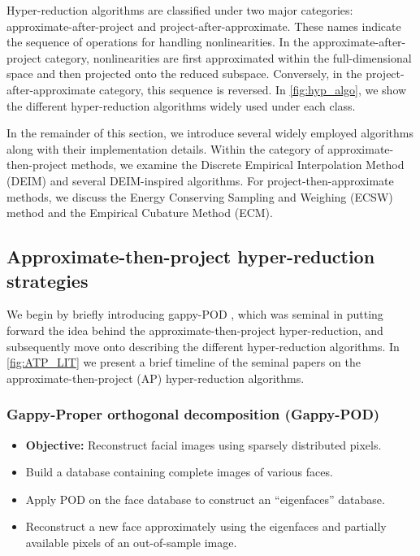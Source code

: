 \documentclass[11pt]{article}
\begin{document}
        Hyper-reduction algorithms are classified under two major categories: approximate-after-project and project-after-approximate.
        These names indicate the sequence of operations for handling nonlinearities.
        In the approximate-after-project category, nonlinearities are first approximated within the full-dimensional space and then projected onto the reduced subspace.
        Conversely, in the project-after-approximate category, this sequence is reversed.
        In  \cref{fig:hyp_algo}, we show the different hyper-reduction algorithms widely used under each class.











        In the remainder of this section, we introduce several widely employed algorithms along with their implementation details.
        Within the category of approximate-then-project methods, we examine the Discrete Empirical Interpolation Method (DEIM) and several DEIM-inspired algorithms.
        For project-then-approximate methods, we discuss the Energy Conserving Sampling and Weighing (ECSW) method and the Empirical Cubature Method (ECM).

        \subsection{Approximate-then-project hyper-reduction strategies}

        We begin by briefly introducing gappy-POD \cite{everson1995karhunen--loeve}, which was seminal in putting forward the idea behind the approximate-then-project hyper-reduction, and subsequently move onto describing the different hyper-reduction algorithms.
        In \cref{fig:ATP_LIT} we present a brief timeline of the seminal papers on the approximate-then-project (AP) hyper-reduction algorithms.



        \subsubsection{Gappy-Proper orthogonal decomposition (Gappy-POD)}
        \label{sec:Gappy}

        \noindent\hrulefill
        \begin{itemize}
                \item {\bfseries Objective:} Reconstruct facial images using sparsely distributed pixels.
                \item Build a database containing complete images of various faces.
                \item Apply POD on the face database to construct an ``eigenfaces'' database.
                \item Reconstruct a new face approximately using the eigenfaces and partially available pixels of an out-of-sample image.
        \end{itemize}
        \noindent\hrulefill
\end{document}
